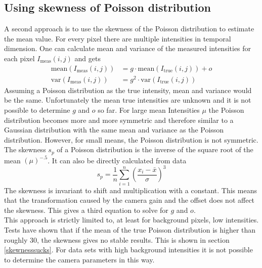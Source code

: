\subsection{Using skewness of Poisson distribution}
A second approach is to use the skewness of the Poisson distribution to estimate the mean value.\newline
For every pixel there are multiple intensities in temporal dimension. One can
calculate mean and variance of the measured intensities for each pixel $I_\text{meas}(i,j)$ and
gets
\begin{align}
	\text{mean}(I_\text{meas}(i,j))& = g\cdot \text{mean}(I_\text{true}(i,j)) + o \label{meanvarPoiss1}\\
	\text{var}(I_\text{meas}(i,j))& = g^2\cdot\text{var}(I_\text{true}(i,j)) \label{meanvarPoiss2}
\end{align}
Assuming a Poisson distribution as the true intensity, mean and variance would
be the same. Unfortunately the mean true intensities are unknown and it is
not possible to determine $g$ and $o$ so far. For large mean Intensities $\mu$
the Poisson distribution becomes more and more symmetric and therefore similar to a Gaussian distribution
with the same mean and variance as the Poisson distribution. However, for small means, the Poisson distribution is not
symmetric. The skewness $s_p$ of a Poisson distribution is the inverse of the
square root of the mean $(\mu)^{-.5}$. It can also be directly
calculated from data
\begin{equation}
	s_p = \frac{1}{n}\sum_{i = 1}^n \left(\frac{x_i - \bar x}{\sigma}\right)^3
\end{equation}
The skewness is invariant to shift and multiplication with a constant. This
means that the transformation caused by the camera gain and the offset
does not affect the skewness. This gives a third equation to solve for $g$ and
$o$.\\
This approach is strictly limited to, at least for background pixels, low intensities. Tests have shown that if the mean of the true Poisson distribution is higher than roughly 30, the skewness gives no stable results. This is shown in section \ref{skewnesssucks}. For data sets with high background intensities it is not possible to determine the camera parameters in this way.

